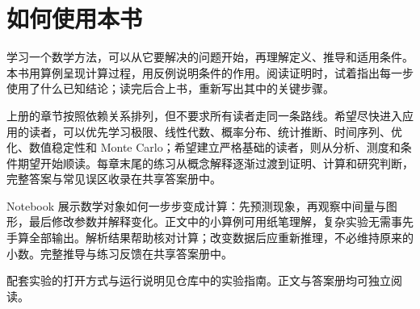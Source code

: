 \section*{如何使用本书}

学习一个数学方法，可以从它要解决的问题开始，再理解定义、推导和适用条件。本书用算例呈现计算过程，用反例说明条件的作用。阅读证明时，试着指出每一步使用了什么已知结论；读完后合上书，重新写出其中的关键步骤。

上册的章节按照依赖关系排列，但不要求所有读者走同一条路线。希望尽快进入应用的读者，可以优先学习极限、线性代数、概率分布、统计推断、时间序列、优化、数值稳定性和 Monte Carlo；希望建立严格基础的读者，则从分析、测度和条件期望开始顺读。每章末尾的练习从概念解释逐渐过渡到证明、计算和研究判断，完整答案与常见误区收录在共享答案册中。

Notebook 展示数学对象如何一步步变成计算：先预测现象，再观察中间量与图形，最后修改参数并解释变化。正文中的小算例可用纸笔理解，复杂实验无需事先手算全部输出。解析结果帮助核对计算；改变数据后应重新推理，不必维持原来的小数。完整推导与练习反馈在共享答案册中。

配套实验的打开方式与运行说明见仓库中的实验指南。正文与答案册均可独立阅读。
